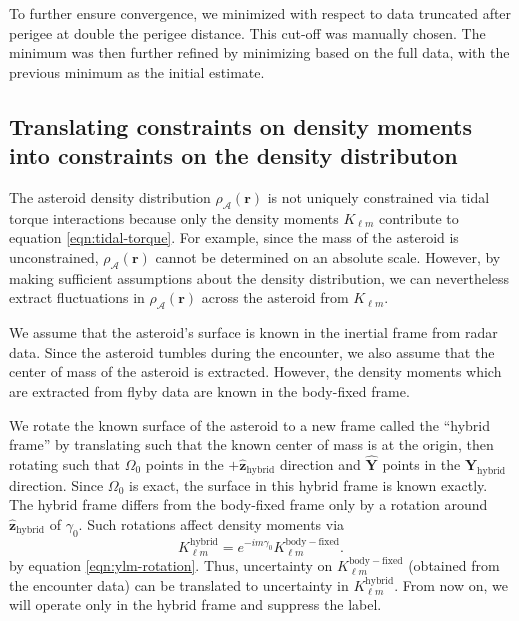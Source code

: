 \documentclass[fleqn,usenatbib]{mnras}
\newcommand{\unit}[1]{\bm{\hat{#1}}}
\begin{document}
To further ensure convergence, we minimized with respect to data truncated after perigee at double the perigee distance. This cut-off was manually chosen. The minimum was then further refined by minimizing based on the full data, with the previous minimum as the initial estimate.


\subsection{Translating constraints on density moments into constraints on the density distributon}
\label{sec:density-distro}

The asteroid density distribution $\rho_\mathcal{A}(\bm r)$ is not uniquely constrained via tidal torque interactions because only the density moments $K_{\ell m}$ contribute to equation \ref{eqn:tidal-torque}. For example, since the mass of the asteroid is unconstrained, $\rho_\mathcal{A}(\bm r)$ cannot be determined on an absolute scale. However, by making sufficient assumptions about the density distribution, we can nevertheless extract fluctuations in $\rho_\mathcal{A}(\bm r)$ across the asteroid from $K_{\ell m}$.

We assume that the asteroid's surface is known in the inertial frame from radar data. Since the asteroid tumbles during the encounter, we also assume that the center of mass of the asteroid is extracted. However, the density moments which are extracted from flyby data are known in the body-fixed frame.

We rotate the known surface of the asteroid to a new frame called the ``hybrid frame'' by translating such that the known center of mass is at the origin, then rotating such that $\Omega_0$ points in the $+\unit z_\text{hybrid}$ direction and $\unit Y$ points in the $\unit Y_\text{hybrid}$ direction. Since $\Omega_0$ is exact, the surface in this hybrid frame is known exactly. The hybrid frame differs from the body-fixed frame only by a rotation around $\unit z_\text{hybrid}$ of $\gamma_0$. Such rotations affect density moments via 
\begin{equation}
  K_{\ell m}^\mathrm{hybrid} = e^{-im\gamma_0}K_{\ell m}^\mathrm{body-fixed}.
  \label{eqn:body-fixed-to-hybrid}
\end{equation}
by equation \ref{eqn:ylm-rotation}. Thus, uncertainty on $K_{\ell m}^\mathrm{body-fixed}$ (obtained from the encounter data) can be translated to uncertainty in $K_{\ell m}^\mathrm{hybrid}$. From now on, we will operate only in the hybrid frame and suppress the label.
\end{document}
